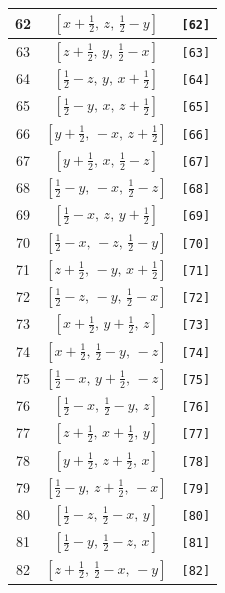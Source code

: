 \documentclass[fleqn,8pt]{jsarticle}
\begin{document}
\begin{longtable}{ccc}
62 & $\left[ x + \frac{1}{2},\, z,\, \frac{1}{2} - y \right]$ & {\tt [62]} \\ \hline
63 & $\left[ z + \frac{1}{2},\, y,\, \frac{1}{2} - x \right]$ & {\tt [63]} \\ \hline
64 & $\left[ \frac{1}{2} - z,\, y,\, x + \frac{1}{2} \right]$ & {\tt [64]} \\ \hline
65 & $\left[ \frac{1}{2} - y,\, x,\, z + \frac{1}{2} \right]$ & {\tt [65]} \\ \hline
66 & $\left[ y + \frac{1}{2},\, - x,\, z + \frac{1}{2} \right]$ & {\tt [66]} \\ \hline
67 & $\left[ y + \frac{1}{2},\, x,\, \frac{1}{2} - z \right]$ & {\tt [67]} \\ \hline
68 & $\left[ \frac{1}{2} - y,\, - x,\, \frac{1}{2} - z \right]$ & {\tt [68]} \\ \hline
69 & $\left[ \frac{1}{2} - x,\, z,\, y + \frac{1}{2} \right]$ & {\tt [69]} \\ \hline
70 & $\left[ \frac{1}{2} - x,\, - z,\, \frac{1}{2} - y \right]$ & {\tt [70]} \\ \hline
71 & $\left[ z + \frac{1}{2},\, - y,\, x + \frac{1}{2} \right]$ & {\tt [71]} \\ \hline
72 & $\left[ \frac{1}{2} - z,\, - y,\, \frac{1}{2} - x \right]$ & {\tt [72]} \\ \hline
73 & $\left[ x + \frac{1}{2},\, y + \frac{1}{2},\, z \right]$ & {\tt [73]} \\ \hline
74 & $\left[ x + \frac{1}{2},\, \frac{1}{2} - y,\, - z \right]$ & {\tt [74]} \\ \hline
75 & $\left[ \frac{1}{2} - x,\, y + \frac{1}{2},\, - z \right]$ & {\tt [75]} \\ \hline
76 & $\left[ \frac{1}{2} - x,\, \frac{1}{2} - y,\, z \right]$ & {\tt [76]} \\ \hline
77 & $\left[ z + \frac{1}{2},\, x + \frac{1}{2},\, y \right]$ & {\tt [77]} \\ \hline
78 & $\left[ y + \frac{1}{2},\, z + \frac{1}{2},\, x \right]$ & {\tt [78]} \\ \hline
79 & $\left[ \frac{1}{2} - y,\, z + \frac{1}{2},\, - x \right]$ & {\tt [79]} \\ \hline
80 & $\left[ \frac{1}{2} - z,\, \frac{1}{2} - x,\, y \right]$ & {\tt [80]} \\ \hline
81 & $\left[ \frac{1}{2} - y,\, \frac{1}{2} - z,\, x \right]$ & {\tt [81]} \\ \hline
82 & $\left[ z + \frac{1}{2},\, \frac{1}{2} - x,\, - y \right]$ & {\tt [82]} \\ \hline

\end{longtable}
\end{document}
